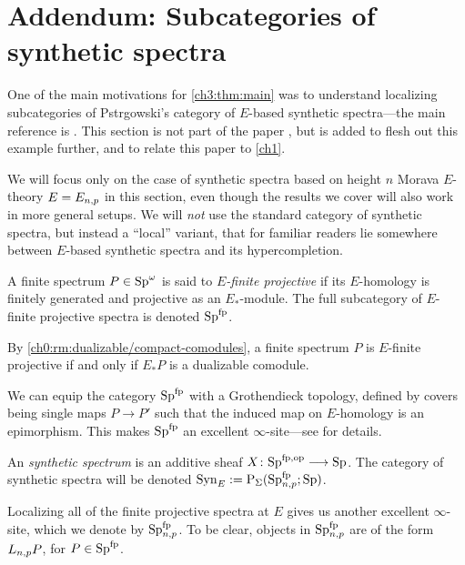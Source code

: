 
\section{Addendum: Subcategories of synthetic spectra}
\label{ch3:addendum}

One of the main motivations for \cref{ch3:thm:main} was to understand localizing subcategories of Pstr\a{}gowski's category of $E$-based synthetic spectra---the main reference is \cite{pstragowski_2022}. This section is not part of the paper \cite{aambo_2024_localizing}, but is added to flesh out this example further, and to relate this paper to \cref{ch1}. 

We will focus only on the case of synthetic spectra based on height $n$ Morava $E$-theory $E=E_{n,p}$ in this section, even though the results we cover will also work in more general setups. We will \emph{not} use the standard category of synthetic spectra, but instead a ``local'' variant, that for familiar readers lie somewhere between $E$-based synthetic spectra and its hypercompletion. 

\begin{definition}
    A finite spectrum $P\in \mathrm{Sp}^\omega$ is said to \emph{$E$-finite projective} if its $E$-homology is finitely generated and projective as an $E_{*}$-module. The full subcategory of $E$-finite projective spectra is denoted $\mathrm{Sp}^{\mathrm{fp}}$. 
\end{definition}

\begin{remark}
    By \cref{ch0:rm:dualizable/compact-comodules}, a finite spectrum $P$ is $E$-finite projective if and only if $E_{*}P$ is a dualizable comodule. 
\end{remark}

We can equip the category $\mathrm{Sp}^{\mathrm{fp}}$ with a Grothendieck topology, defined by covers being single maps $P\to P'$ such that the induced map on $E$-homology is an epimorphism. This makes $\mathrm{Sp}^{\mathrm{fp}}$ an excellent $\infty$-site---see \cite[Section 2.3]{pstragowski_2022} for details. 

\begin{definition}
    An \emph{synthetic spectrum} is an additive sheaf $X\colon \mathrm{Sp}^{\mathrm{fp}, \mathrm{op}}\longrightarrow \mathrm{Sp}$. The category of synthetic spectra will be denoted $\mathrm{Syn}_{E} := \mathrm{P}_\Sigma(\mathrm{Sp}_{n,p}^{\mathrm{fp}};\mathrm{Sp})$. 
\end{definition}

Localizing all of the finite projective spectra at $E$ gives us another excellent $\infty$-site, which we denote by $\mathrm{Sp}_{n,p}^{\mathrm{fp}}$. To be clear, objects in $\mathrm{Sp}_{n,p}^{\mathrm{fp}}$ are of the form $L_{n,p} P$, for $P\in \mathrm{Sp}^{\mathrm{fp}}$. 

